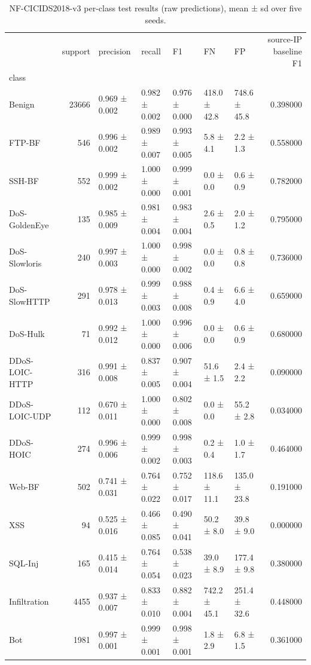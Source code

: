 \begin{table}
\caption{NF-CICIDS2018-v3 per-class test results (raw predictions), mean ± sd over five seeds.}
\label{tab:table2_per_class_raw}
\begin{tabular}{lrlllllr}
\toprule
 & support & precision & recall & F1 & FN & FP & source-IP baseline F1 \\
class &  &  &  &  &  &  &  \\
\midrule
Benign & 23666 & 0.969 ± 0.002 & 0.982 ± 0.002 & 0.976 ± 0.000 & 418.0 ± 42.8 & 748.6 ± 45.8 & 0.398000 \\
FTP-BF & 546 & 0.996 ± 0.002 & 0.989 ± 0.007 & 0.993 ± 0.005 & 5.8 ± 4.1 & 2.2 ± 1.3 & 0.558000 \\
SSH-BF & 552 & 0.999 ± 0.002 & 1.000 ± 0.000 & 0.999 ± 0.001 & 0.0 ± 0.0 & 0.6 ± 0.9 & 0.782000 \\
DoS-GoldenEye & 135 & 0.985 ± 0.009 & 0.981 ± 0.004 & 0.983 ± 0.004 & 2.6 ± 0.5 & 2.0 ± 1.2 & 0.795000 \\
DoS-Slowloris & 240 & 0.997 ± 0.003 & 1.000 ± 0.000 & 0.998 ± 0.002 & 0.0 ± 0.0 & 0.8 ± 0.8 & 0.736000 \\
DoS-SlowHTTP & 291 & 0.978 ± 0.013 & 0.999 ± 0.003 & 0.988 ± 0.008 & 0.4 ± 0.9 & 6.6 ± 4.0 & 0.659000 \\
DoS-Hulk & 71 & 0.992 ± 0.012 & 1.000 ± 0.000 & 0.996 ± 0.006 & 0.0 ± 0.0 & 0.6 ± 0.9 & 0.680000 \\
DDoS-LOIC-HTTP & 316 & 0.991 ± 0.008 & 0.837 ± 0.005 & 0.907 ± 0.004 & 51.6 ± 1.5 & 2.4 ± 2.2 & 0.090000 \\
DDoS-LOIC-UDP & 112 & 0.670 ± 0.011 & 1.000 ± 0.000 & 0.802 ± 0.008 & 0.0 ± 0.0 & 55.2 ± 2.8 & 0.034000 \\
DDoS-HOIC & 274 & 0.996 ± 0.006 & 0.999 ± 0.002 & 0.998 ± 0.003 & 0.2 ± 0.4 & 1.0 ± 1.7 & 0.464000 \\
Web-BF & 502 & 0.741 ± 0.031 & 0.764 ± 0.022 & 0.752 ± 0.017 & 118.6 ± 11.1 & 135.0 ± 23.8 & 0.191000 \\
XSS & 94 & 0.525 ± 0.016 & 0.466 ± 0.085 & 0.490 ± 0.041 & 50.2 ± 8.0 & 39.8 ± 9.0 & 0.000000 \\
SQL-Inj & 165 & 0.415 ± 0.014 & 0.764 ± 0.054 & 0.538 ± 0.023 & 39.0 ± 8.9 & 177.4 ± 9.8 & 0.380000 \\
Infiltration & 4455 & 0.937 ± 0.007 & 0.833 ± 0.010 & 0.882 ± 0.004 & 742.2 ± 45.1 & 251.4 ± 32.6 & 0.448000 \\
Bot & 1981 & 0.997 ± 0.001 & 0.999 ± 0.001 & 0.998 ± 0.001 & 1.8 ± 2.9 & 6.8 ± 1.5 & 0.361000 \\
\bottomrule
\end{tabular}
\end{table}
